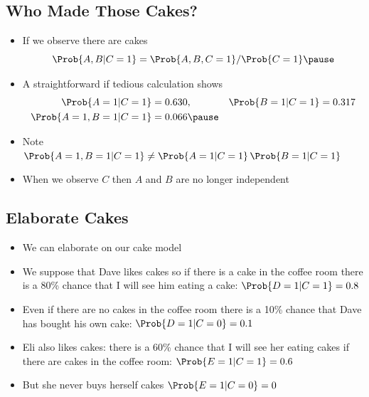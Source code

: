 
\begin{slide}
\section{Who Made Those Cakes?}

\begin{PauseHighLight}
  \begin{itemize}
    \item If we observe there are cakes
    $$ \Prob{A,B|C=1} = \Prob{A,B,C=1}/\Prob{C=1} \pause $$
  \item A straightforward if tedious calculation shows
    \begin{align*}
      \Prob{A=1|C=1} &=0.630, &
      \Prob{B=1|C=1} &= 0.317 \\
      \Prob{A=1,B=1|C=1} &= 0.066 \pause
    \end{align*}
  \item Note \(\Prob{A=1,B=1|C=1} \neq \Prob{A=1|C=1} \,
    \Prob{B=1|C=1}\)\pause
  \item When we observe $C$ then $A$ and $B$ are no longer independent\pause
  \end{itemize}
\end{PauseHighLight}

\end{slide}


\begin{slide}
\section[-2]{Elaborate Cakes}

\begin{PauseHighLight}
  \begin{itemize}\squeeze
  \item We can elaborate on our cake model\pause
  \item We suppose that Dave likes cakes so if there is a cake in the
    coffee room there is a 80\% chance that I will see him eating a
    cake: \(\Prob{D=1|C=1}=0.8\)\pause
  \item Even if there are no cakes in the coffee room there is a 10\%
    chance that Dave has bought his own cake: \(\Prob{D=1|C=0}=0.1\)\pause
  \item Eli also likes cakes: there is a 60\% chance that I will see
    her eating cakes if there are cakes in the coffee room:
    \(\Prob{E=1|C=1}=0.6\)\pause
  \item But she never buys herself cakes \(\Prob{E=1|C=0}=0\)\pause
  \end{itemize}
\end{PauseHighLight}

\end{slide}

